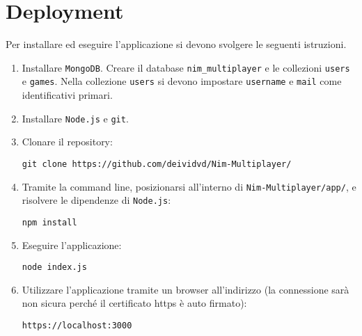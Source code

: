 \section{Deployment}

Per installare ed eseguire l'applicazione si devono svolgere le seguenti istruzioni.
\begin{enumerate}
\item
	Installare \texttt{MongoDB}. Creare il database \texttt{nim\_multiplayer} e le collezioni \texttt{users} e \texttt{games}. Nella collezione \texttt{users} si devono impostare \texttt{username} e \texttt{mail} come identificativi primari.
\item
	Installare \texttt{Node.js} e \texttt{git}.
\item
	Clonare il repository:
	
	\texttt{git clone https://github.com/deividvd/Nim-Multiplayer/}
\item
	Tramite la command line, posizionarsi all'interno di \texttt{Nim-Multiplayer/app/}, e risolvere le dipendenze di \texttt{Node.js}:
	
	\texttt{npm install}
\item
	Eseguire l'applicazione:
	
	\texttt{node index.js}
\item
	Utilizzare l'applicazione tramite un browser all'indirizzo (la connessione sarà non sicura perché il certificato https è auto firmato):
	
	\texttt{https://localhost:3000}
\end{enumerate}

\newpage
